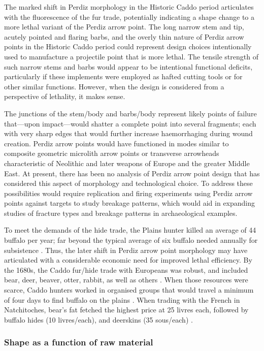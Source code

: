 \documentclass[review]{elsarticle}
\begin{document}
The marked shift in Perdiz morphology in the Historic Caddo period articulates with the fluorescence of the fur trade, potentially indicating a shape change to a more lethal variant of the Perdiz arrow point. The long narrow stem and tip, acutely pointed and flaring barbs, and the overly thin nature of Perdiz arrow points in the Historic Caddo period could represent design choices intentionally used to manufacture a projectile point that is more lethal. The tensile strength of such narrow stems and barbs would appear to be intentional functional deficits, particularly if these implements were employed as hafted cutting tools or for other similar functions. However, when the design is considered from a perspective of lethality, it makes sense.

The junctions of the stem/body and barbs/body represent likely points of failure that---upon impact---would shatter a complete point into several fragments; each with very sharp edges that would further increase haemorrhaging during wound creation. Perdiz arrow points would have functioned in modes similar to composite geometric microlith arrow points or transverse arrowheads characteristic of Neolithic and later weapons of Europe and the greater Middle East. At present, there has been no analysis of Perdiz arrow point design that has considered this aspect of morphology and technological choice. To address these possibilities would require replication and firing experiments using Perdiz arrow points against targets to study breakage patterns, which would aid in expanding studies of fracture types and breakage patterns in archaeological examples.

To meet the demands of the hide trade, the Plains hunter killed an average of 44 buffalo per year; far beyond the typical average of six buffalo needed annually for subsistence \citep{RN39}. Thus, the later shift in Perdiz arrow point morphology may have articulated with a considerable economic need for improved lethal efficiency. By the 1680s, the Caddo fur/hide trade with Europeans was robust, and included bear, deer, beaver, otter, rabbit, as well as others \citep{RN9005,RN39,RN8076}. When those resources were scarce, Caddo hunters worked in organised groups that would travel a minimum of four days to find buffalo on the plains \citep{RN9005,RN38}. When trading with the French in Natchitoches, bear's fat fetched the highest price at 25 livres each, followed by buffalo hides (10 livres/each), and deerskins (35 sous/each) \citep{RN9005}.

\subsubsection*{Shape as a function of raw material}
\end{document}
